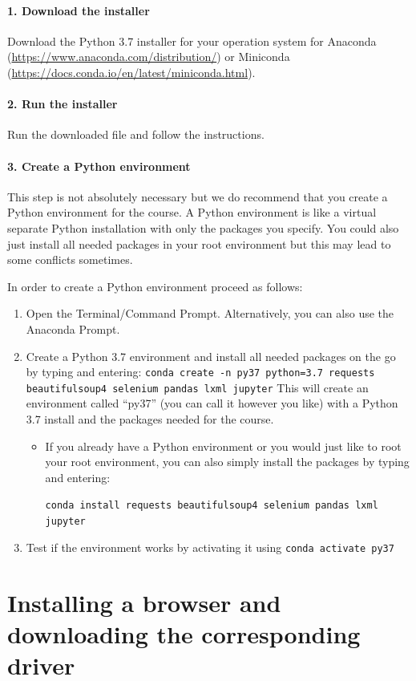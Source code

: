 \documentclass[a4paper]{article}
\begin{document}
\paragraph{1. Download the installer} Download the Python 3.7 installer for your operation system for Anaconda (\url{https://www.anaconda.com/distribution/}) or Miniconda (\url{https://docs.conda.io/en/latest/miniconda.html}).

\paragraph{2. Run the installer} Run the downloaded file and follow the instructions.

\paragraph{3. Create a Python environment} This step is not absolutely necessary but we do recommend that you create a Python environment for the course. A Python environment is like a virtual separate Python installation with only the packages you specify. You could also just install all needed packages in your root environment but this may lead to some conflicts sometimes.

In order to create a Python environment proceed as follows:
\begin{enumerate}
	\item Open the Terminal/Command Prompt. Alternatively, you can also use the Anaconda Prompt.
	\item Create a Python 3.7 environment and install all needed packages on the go by typing and entering: \verb!conda create -n py37 python=3.7 requests beautifulsoup4 selenium pandas lxml jupyter! This will create an environment called ``py37'' (you can call it however you like) with a Python 3.7 install and the packages needed for the course.
	\begin{itemize}
		\item If you already have a Python environment or you would just like to root your root environment, you can also simply install the packages by typing and entering: 
		
		\verb!conda install requests beautifulsoup4 selenium pandas lxml jupyter!
	\end{itemize}
	\item Test if the environment works by activating it using \verb!conda activate py37!
\end{enumerate}

\section{Installing a browser and downloading the corresponding driver}
\end{document}
